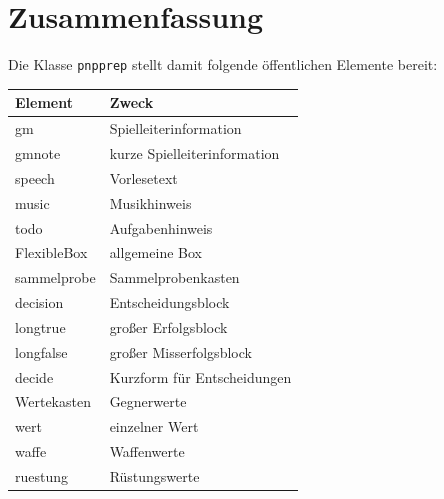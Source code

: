 \section{Zusammenfassung}

Die Klasse \texttt{pnpprep} stellt damit folgende öffentlichen Elemente bereit:

\begin{center}
\begin{tabular}{|l|l|}
\hline
Element & Zweck\\
\hline
gm & Spielleiterinformation\\
\hline
gmnote & kurze Spielleiterinformation\\
\hline
speech & Vorlesetext\\
\hline
music & Musikhinweis\\
\hline
todo & Aufgabenhinweis\\
\hline
FlexibleBox & allgemeine Box\\
\hline
sammelprobe & Sammelprobenkasten\\
\hline
decision & Entscheidungsblock\\
\hline
longtrue & großer Erfolgsblock\\
\hline
longfalse & großer Misserfolgsblock\\
\hline
decide & Kurzform für Entscheidungen\\
\hline
Wertekasten & Gegnerwerte\\
\hline
wert & einzelner Wert\\
\hline
waffe & Waffenwerte\\
\hline
ruestung & Rüstungswerte\\
\hline
\end{tabular}
\end{center} 
